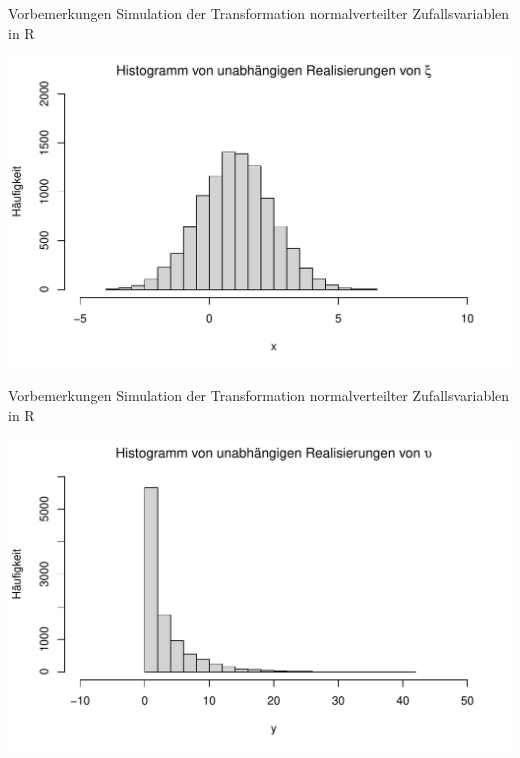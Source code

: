 \documentclass[
  8pt,
  ignorenonframetext,
]{beamer}
\begin{document}
\begin{frame}{Vorbemerkungen}
\protect\hypertarget{vorbemerkungen-4}{}
Simulation der Transformation normalverteilter Zufallsvariablen in R

\vspace{4mm}

\begin{center}\includegraphics[width=0.9\linewidth]{8_Abbildungen/wtfi_8_hist_x} \end{center}
\end{frame}

\begin{frame}{Vorbemerkungen}
\protect\hypertarget{vorbemerkungen-5}{}
Simulation der Transformation normalverteilter Zufallsvariablen in R

\vspace{4mm}
\center

\begin{center}\includegraphics[width=0.9\linewidth]{8_Abbildungen/wtfi_8_hist_y} \end{center}
\end{frame}
\end{document}
